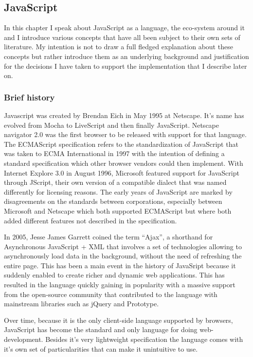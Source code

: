 \subsection{JavaScript}

In this chapter I speak about JavaScript as a language, the eco-system around it and I introduce various concepts that have all been subject to their own sets of literature. My intention is not to draw a full fledged explanation about these concepts but rather introduce them as an underlying background and justification for the decisions I have taken to support the implementation that I describe later on.

\subsubsection{Brief history}

Javascript was created by Brendan Eich in May 1995 at Netscape. It's name has evolved from Mocha to LiveScript and then finally JavaScript. Netscape navigator 2.0 was the first browser to be released with support for that language. The ECMAScript specification refers to the standardization of JavaScript that was taken to ECMA International in 1997 with the intention of defining a standard specification which other browser vendors could then implement. With Internet Explore 3.0 in August 1996, Microsoft featured support for JavaScript through JScript, their own version of a compatible dialect that was named differently for licensing reasons. The early years of JavaScript are marked by disagreements on the standards between corporations, especially between Microsoft and Netscape which both supported ECMAScript but where both added different features not described in the specification.

In 2005, Jesse James Garrett coined the term ``Ajax''\cite{Garrett2005}, a shorthand for Asynchronous JavaScript + XML that involves a set of technologies allowing to asynchronously load data in the background, without the need of refreshing the entire page. This has been a main event in the history of JavaSript because it suddenly enabled to create richer and dynamic web applications. This has resulted in the language quickly gaining in popularity with a massive support from the open-source community that contributed to the language with mainstream libraries such as jQuery and Prototype.

Over time, because it is the only client-side language supported by browsers, JavaScript has become the standard and only language for doing web-development. Besides it's very lightweight specification the language comes with it's own set of particularities that can make it unintuitive to use.

